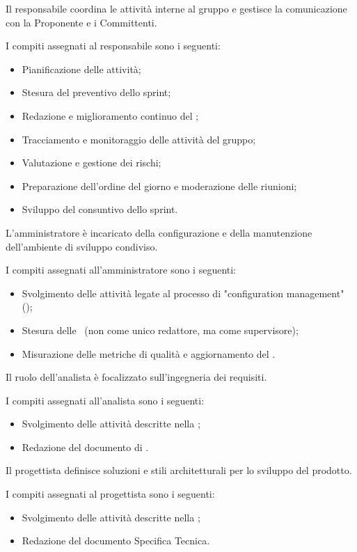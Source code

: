 \par Il responsabile coordina le attività interne al gruppo e gestisce la comunicazione con la Proponente e i Committenti.
\par I compiti assegnati al responsabile sono i seguenti:
\begin{itemize}
  \item Pianificazione delle attività;
  \item Stesura del preventivo dello sprint;
  \item Redazione e miglioramento continuo del \PdP;
  \item Tracciamento e monitoraggio delle attività del gruppo;
  \item Valutazione e gestione dei rischi;
  \item Preparazione dell'ordine del giorno e moderazione delle riunioni;
  \item Sviluppo del consuntivo dello sprint.
\end{itemize}

\par L'amministratore è incaricato della configurazione e della manutenzione dell'ambiente di sviluppo condiviso.
\par I compiti assegnati all'amministratore sono i seguenti:
\begin{itemize}
  \item Svolgimento delle attività legate al processo di "configuration management" ();
  \item Stesura delle \NdP\ (non come unico redattore, ma come supervisore);
  \item Misurazione delle metriche di qualità e aggiornamento del \PdQ.
\end{itemize}

\par Il ruolo dell'analista è focalizzato sull'ingegneria dei requisiti.
\par I compiti assegnati all'analista sono i seguenti:
\begin{itemize}
  \item Svolgimento delle attività descritte nella ;
  \item Redazione del documento di \AdR.
\end{itemize}

\par Il progettista definisce soluzioni e stili architetturali per lo sviluppo del prodotto.
\par I compiti assegnati al progettista sono i seguenti:
\begin{itemize}
  \item Svolgimento delle attività descritte nella ;
  \item Redazione del documento Specifica Tecnica.
\end{itemize}


